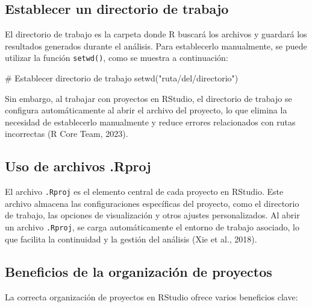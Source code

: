 \documentclass[
  spanish,
  a4paper,
  DIV=11,
  numbers=noendperiod,
  onepage,
  openany]{scrreprt}
\newenvironment{Shaded}{\begin{snugshade}}{\end{snugshade}}
\newcommand{\CommentTok}[1]{\textcolor[rgb]{0.37,0.37,0.37}{#1}}
\newcommand{\FunctionTok}[1]{\textcolor[rgb]{0.28,0.35,0.67}{#1}}
\newcommand{\NormalTok}[1]{\textcolor[rgb]{0.00,0.23,0.31}{#1}}
\newcommand{\StringTok}[1]{\textcolor[rgb]{0.13,0.47,0.30}{#1}}
\begin{document}
\subsection{Establecer un directorio de
trabajo}\label{establecer-un-directorio-de-trabajo}

El directorio de trabajo es la carpeta donde R buscará los archivos y
guardará los resultados generados durante el análisis. Para establecerlo
manualmente, se puede utilizar la función \texttt{setwd()}, como se
muestra a continuación:

\begin{Shaded}
\begin{Highlighting}[]
\CommentTok{\# Establecer directorio de trabajo}
\FunctionTok{setwd}\NormalTok{(}\StringTok{"ruta/del/directorio"}\NormalTok{)}
\end{Highlighting}
\end{Shaded}

Sin embargo, al trabajar con proyectos en RStudio, el directorio de
trabajo se configura automáticamente al abrir el archivo del proyecto,
lo que elimina la necesidad de establecerlo manualmente y reduce errores
relacionados con rutas incorrectas (R Core Team, 2023).

\subsection{Uso de archivos .Rproj}\label{uso-de-archivos-.rproj}

El archivo \texttt{.Rproj} es el elemento central de cada proyecto en
RStudio. Este archivo almacena las configuraciones específicas del
proyecto, como el directorio de trabajo, las opciones de visualización y
otros ajustes personalizados. Al abrir un archivo \texttt{.Rproj}, se
carga automáticamente el entorno de trabajo asociado, lo que facilita la
continuidad y la gestión del análisis (Xie et al., 2018).

\subsection{Beneficios de la organización de
proyectos}\label{beneficios-de-la-organizaciuxf3n-de-proyectos}

La correcta organización de proyectos en RStudio ofrece varios
beneficios clave:
\end{document}
